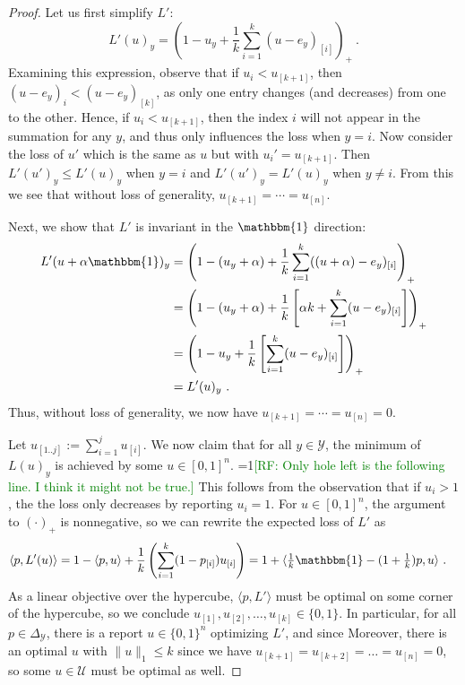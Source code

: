 \documentclass[12pt]{article}
\newcommand{\Comments}{1}
\newcommand{\mynote}[2]{\ifnum\Comments=1\textcolor{#1}{#2}\fi}
\newcommand{\raf}[1]{\mynote{green}{[RF: #1]}}
\newcommand{\simplex}{\Delta_\Y}
\newcommand{\U}{\mathcal{U}}
\newcommand{\Y}{\mathcal{Y}}
\newcommand{\inprod}[2]{\langle #1, #2 \rangle}%
\newcommand{\ones}{\mathbbm{1}}
\begin{document}
\begin{proof}
  Let us first simplify $L'$:
  \[
    L'(u)_y = \left( 1 - u_y + \frac{1}{k} \sum_{i=1}^k (u - e_y)_{[i]} \right)_+~.
  \]
  Examining this expression, observe that
  if $u_i < u_{[k+1]}$, then $(u-e_y)_i < (u-e_y)_{[k]}$, as only one entry changes (and decreases) from one to the other.
  Hence, if $u_i < u_{[k+1]}$, then the index $i$ will not appear in the summation for any $y$, and thus only influences the loss when $y=i$.
  Now consider the loss of $u'$ which is the same as $u$ but with $u_i' = u_{[k+1]}$.
  Then $L'(u')_y \leq L'(u)_y$ when $y=i$ and $L'(u')_y = L'(u)_y$ when $y\neq i$.
  From this we see that without loss of generality, $u_{[k+1]} = \cdots = u_{[n]}$.
  
  Next, we show that $L'$ is invariant in the $\ones$ direction:
  \begin{align*}
    L'(u + \alpha \ones)_y &= \left( 1 - (u_y + \alpha) + \frac{1}{k} \sum_{i=1}^k ((u + \alpha) - e_y)_{[i]} \right)_+\\
    &= \left( 1 - (u_y + \alpha) + \frac{1}{k}\left[ \alpha k + \sum_{i=1}^k (u - e_y)_{[i]} \right] \right)_+\\
    &= \left( 1 -u_y + \frac{1}{k}\left[ \sum_{i=1}^k (u - e_y)_{[i]} \right] \right)_+\\
  &= L'(u)_y~.
  \end{align*}
  Thus, without loss of generality, we now have $u_{[k+1]} = \cdots = u_{[n]} = 0$.

  Let $u_{[1..j]} := \sum_{i=1}^j u_{[i]}$.
  We now claim that for all $y \in \Y$, the minimum of $L(u)_y$ is achieved by some $u \in [0,1]^n$.
  \raf{Only hole left is the following line.  I think it might not be true.}
  This follows from the observation that if $u_i > 1$, the the loss only decreases by reporting $u_i = 1$.
  For $u\in[0,1]^n$, the argument to $(\cdot)_+$ is nonnegative, so we can rewrite the expected loss of $L'$ as
  \begin{align*}
  	\inprod{p}{L'(u)} &= 1 - \inprod{p}{u} + \frac{1}{k} \left( \sum_{i=1}^k (1 - p_{[i]}) u_{[i]} \right) = 1 + \inprod{\tfrac 1 k \ones - (1+\tfrac 1 k)p}{u}~.
  \end{align*}
  As a linear objective over the hypercube, $\inprod{p}{L'}$ must be optimal on some corner of the hypercube, so we conclude $u_{[1]}, u_{[2]}, \ldots, u_{[k]} \in \{0,1\}$.
  In particular, for all $p \in \simplex$, there is a report $u \in \{0,1\}^n$ optimizing $L'$, and since
  Moreover, there is an optimal $u$ with $\|u\|_{1} \leq k$ since we have $u_{[k+1]} = u_{[k+2]} = \ldots = u_{[n]} = 0$, so some $u \in \U$ must be optimal as well.
\end{proof}
\end{document}
